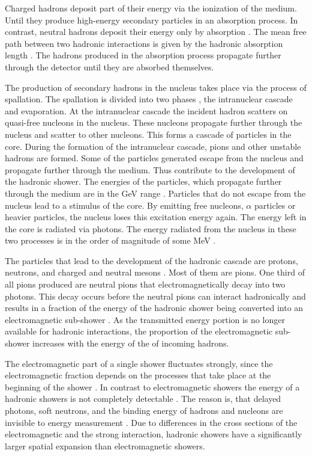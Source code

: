 \documentclass[12pt, a4paper]{thesis}
\begin{document}
Charged hadrons deposit part of their energy via the ionization of the
medium. Until they produce high-energy secondary particles in an absorption
process.  In contrast, neutral hadrons deposit their energy only by absorption
\cite{wigman18,fabjan03}. The mean free path between two hadronic interactions is
given by the hadronic absorption length \cite{fabjan03}. The hadrons produced in
the absorption process propagate further through the detector until they are
absorbed themselves.

The production of secondary hadrons in the nucleus takes place via the
process of spallation. The spallation is divided into two phases
\cite{wigman18}, the intranuclear cascade and evaporation.  At the
intranuclear cascade the incident hadron scatters on quasi-free
nucleons in the nucleus. These nucleons propagate further through the
nucleus and scatter to other nucleons. This forms a cascade of
particles in the core. During the formation of the intranuclear
cascade, pions and other unstable hadrons are formed. Some of the
particles generated escape from the nucleus and propagate further
through the medium. Thus contribute to the development of the hadronic
shower. The energies of the particles, which propagate further through
the medium are in the GeV range \cite{fabjan03}. Particles that do not
escape from the nucleus lead to a stimulus of the core. By emitting
free nucleons, $\alpha$ particles or heavier particles, the nucleus loses
this excitation energy again. The energy left in the core is radiated
via photons. The energy radiated from the nucleus in these two
processes is in the order of magnitude of some MeV \cite{fabjan03}.

The particles that lead to the development of the hadronic cascade are
protons, neutrons, and charged and neutral mesons
\cite{fabjan03}. Most of them are pions. One third of all pions
produced are neutral pions that electromagnetically decay into two
photons. This decay occurs before the neutral pions can interact
hadronically and results in a fraction of the energy of the hadronic
shower being converted into an electromagnetic sub-shower
\cite{fabjan03}. As the transmitted energy portion is no longer
available for hadronic interactions, the proportion of the
electromagnetic sub-shower increases with the energy of the of
incoming hadrons.

The electromagnetic part of a single shower fluctuates strongly, since
the electromagnetic fraction depends on the processes that take place
at the beginning of the shower \cite{wigman18}. In contrast to
electromagnetic showers the energy of a hadronic showers is not
completely detectable \cite{wigman18}. The reason is, that delayed
photons, soft neutrons, and the binding energy of hadrons and nucleons
are invisible to energy measurement \cite{fabjan03}. Due to differences
in the cross sections of the electromagnetic and the strong
interaction, hadronic showers have a significantly larger spatial
expansion than electromagnetic showers\cite{wigman18}.
\end{document}
